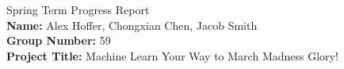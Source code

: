 \documentclass[onecolumn, draftclsnofoot,10pt, compsoc]{IEEEtran}
\def \CapstoneTeamName{		Stat Champs}
\def \CapstoneTeamNumber{		59}
\def \GroupMemberOne{			Alex Hoffer}
\def \GroupMemberTwo{			Chongxian Chen}
\def \GroupMemberThree{			Jacob Smith}
\def \CapstoneProjectName{		Machine Learn Your Way to March Madness Glory}
\def \CapstoneSponsorCompany{	Oregon State University}
\def \CapstoneSponsorPerson{		Dr. Victor Hsu}
\def \DocType{		%
				Progress Report
				}
\newcommand{\NameSigPair}[1]{\par
\makebox[2.75in][r]{#1} \hfil 	\makebox[3.25in]{\makebox[2.25in]{\hrulefill} \hfill		\makebox[.75in]{\hrulefill}}
\par\vspace{-12pt} \textit{\tiny\noindent
\makebox[2.75in]{} \hfil		\makebox[3.25in]{\makebox[2.25in][r]{Signature} \hfill	\makebox[.75in][r]{Date}}}}
\renewcommand{\NameSigPair}[1]{#1}
\begin{document}
\begin{centering}
\huge
Spring Term Progress Report \\
\Large 
\textbf{Name:} Alex Hoffer, Chongxian Chen, Jacob Smith \\
\textbf{Group Number:} 59 \\
\textbf{Project Title:} Machine Learn Your Way to March Madness Glory! \\
\end{centering}
 \begin{singlespace}
      	 \begin{abstract}

\end{abstract}
\end{singlespace}
\end{document}
